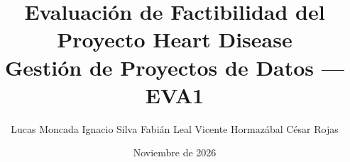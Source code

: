\newcommand{\ProyectoTitulo}{Evaluación de Factibilidad del Proyecto Heart Disease}
\newcommand{\ProyectoSubtitulo}{Gestión de Proyectos de Datos --- EVA1}
\newcommand{\ProyectoAutor}{Lucas Moncada \quad Ignacio Silva \quad Fabián Leal \quad Vicente Hormazábal \quad César Rojas}
\newcommand{\ProyectoFecha}{Noviembre de 2026}

\title{\ProyectoTitulo\\[0.4em]\large \ProyectoSubtitulo}
\author{\ProyectoAutor}
\date{\ProyectoFecha}
